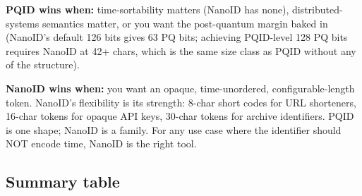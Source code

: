 \textbf{PQID wins when:} time-sortability matters (NanoID has none), distributed-systems semantics matter, or you want the post-quantum margin baked in (NanoID's default 126 bits gives 63 PQ bits; achieving PQID-level 128 PQ bits requires NanoID at 42+ chars, which is the same size class as PQID without any of the structure).

\textbf{NanoID wins when:} you want an opaque, time-unordered, configurable-length token. NanoID's flexibility is its strength: 8-char short codes for URL shorteners, 16-char tokens for opaque API keys, 30-char tokens for archive identifiers. PQID is one shape; NanoID is a family. For any use case where the identifier should NOT encode time, NanoID is the right tool.

\subsection{Summary table}

